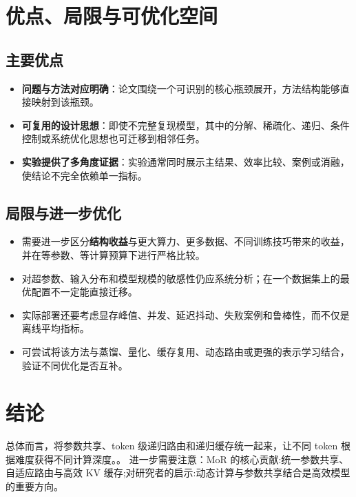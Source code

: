 \documentclass[UTF8,11pt,a4paper]{ctexart}
\newcommand{\term}[1]{\textbf{\textcolor{mainblue}{#1}}}
\begin{document}
\section{优点、局限与可优化空间}
\subsection{主要优点}
\begin{itemize}
\item \term{问题与方法对应明确}：论文围绕一个可识别的核心瓶颈展开，方法结构能够直接映射到该瓶颈。
\item \term{可复用的设计思想}：即使不完整复现模型，其中的分解、稀疏化、递归、条件控制或系统优化思想也可迁移到相邻任务。
\item \term{实验提供了多角度证据}：实验通常同时展示主结果、效率比较、案例或消融，使结论不完全依赖单一指标。
\end{itemize}

\subsection{局限与进一步优化}
\begin{itemize}
\item 需要进一步区分\term{结构收益}与更大算力、更多数据、不同训练技巧带来的收益，并在等参数、等计算预算下进行严格比较。
\item 对超参数、输入分布和模型规模的敏感性仍应系统分析；在一个数据集上的最优配置不一定能直接迁移。
\item 实际部署还要考虑显存峰值、并发、延迟抖动、失败案例和鲁棒性，而不仅是离线平均指标。
\item 可尝试将该方法与蒸馏、量化、缓存复用、动态路由或更强的表示学习结合，验证不同优化是否互补。
\end{itemize}

\section{结论}
总体而言，将参数共享、token 级递归路由和递归缓存统一起来，让不同 token 根据难度获得不同计算深度。。 进一步需要注意：MoR 的核心贡献:统一参数共享、自适应路由与高效 KV 缓存;对研究者的启示:动态计算与参数共享结合是高效模型的重要方向。
\end{document}
